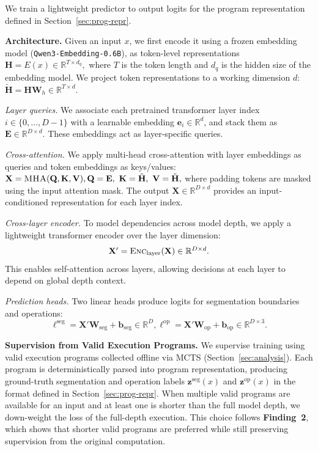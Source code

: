 \documentclass{article}
\theoremstyle{plain}
\theoremstyle{definition}
\theoremstyle{remark}
\begin{document}
We train a lightweight predictor to output logits for the program representation
defined in Section~\ref{sec:prog-repr}.

\textbf{Architecture.}
Given an input $x$, we first encode it using a frozen embedding model
(\texttt{Qwen3-Embedding-0.6B}), as token-level representations
$\textstyle
\mathbf{H}=E(x)\in\mathbb{R}^{T\times d_q},
$
where $T$ is the token length and $d_q$ is the hidden size of the embedding model.
We project token representations to a working dimension $d$:
$\textstyle
\tilde{\mathbf{H}}=\mathbf{H}\mathbf{W}_h \in \mathbb{R}^{T\times d}.
$

\emph{Layer queries.}
We associate each pretrained transformer layer index $i\in\{0,\ldots,D-1\}$ with a learnable
embedding $\mathbf{e}_i\in\mathbb{R}^{d}$, and stack them as
$\mathbf{E}\in\mathbb{R}^{D\times d}$.
These embeddings act as layer-specific queries.

\emph{Cross-attention.}
We apply multi-head cross-attention with layer embeddings as queries and token embeddings
as keys/values:
$\textstyle
\mathbf{X}=\textsc{MHA}(\mathbf{Q},\mathbf{K},\mathbf{V}),
\mathbf{Q}=\mathbf{E},\ \mathbf{K}=\tilde{\mathbf{H}},\ \mathbf{V}=\tilde{\mathbf{H}},
$
where padding tokens are masked using the input attention mask.
The output $\mathbf{X}\in\mathbb{R}^{D\times d}$ provides an input-conditioned representation
for each layer index.

\emph{Cross-layer encoder.}
To model dependencies across model depth,
we apply a lightweight transformer encoder over the layer dimension:
\begingroup
\setlength{\abovedisplayskip}{2pt}
\setlength{\belowdisplayskip}{2pt}
\[
\textstyle
\mathbf{X}'=\textsc{Enc}_{\text{layer}}(\mathbf{X})\in\mathbb{R}^{D\times d}.
\]
\endgroup
This enables self-attention across layers, allowing decisions at each layer
to depend on global depth context.

\emph{Prediction heads.}
Two linear heads produce logits for segmentation boundaries and operations:
\begingroup
\setlength{\abovedisplayskip}{0pt}
\setlength{\belowdisplayskip}{0pt}
\[
\boldsymbol{\ell}^{\text{seg}}=\mathbf{X}'\mathbf{W}_{\text{seg}}+\mathbf{b}_{\text{seg}}
\in\mathbb{R}^{D},
\boldsymbol{\ell}^{\text{op}}=\mathbf{X}'\mathbf{W}_{\text{op}}+\mathbf{b}_{\text{op}}
\in\mathbb{R}^{D\times 3}.
\]
\endgroup



\textbf{Supervision from Valid Execution Programs.}
We supervise training using valid execution programs collected offline via MCTS (Section~\ref{sec:analysis}).
Each program is deterministically parsed into program representation,
producing ground-truth segmentation and operation labels
$\mathbf{z}^{\text{seg}}(x)$ and $\mathbf{z}^{\text{op}}(x)$
in the format defined in Section~\ref{sec:prog-repr}.
When multiple valid programs are available for an input and at least one is shorter than
the full model depth, we down-weight the loss of the full-depth execution.
This choice follows \textbf{Finding~2}, which shows that shorter valid programs are preferred
while still preserving supervision from the original computation.
\end{document}
